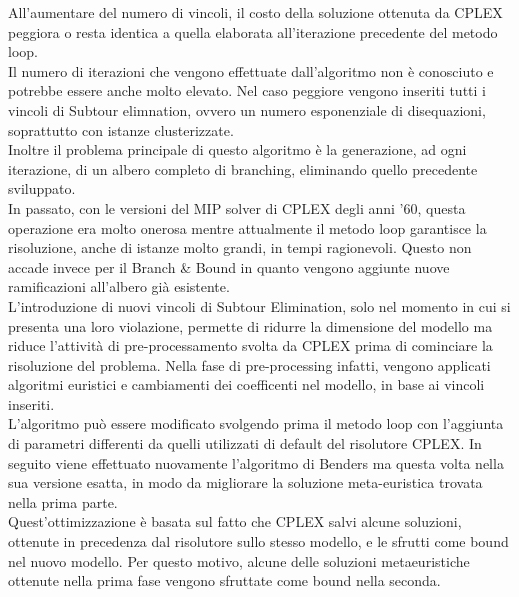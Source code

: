 \vspace{10cm}
All'aumentare del numero di vincoli, il costo della soluzione ottenuta da CPLEX peggiora o resta identica a quella elaborata all'iterazione precedente del metodo loop.\\
Il numero di iterazioni che vengono effettuate dall'algoritmo non è conosciuto e potrebbe essere anche molto elevato. Nel caso peggiore vengono inseriti tutti i vincoli di Subtour elimnation, ovvero un numero esponenziale di disequazioni, soprattutto con istanze clusterizzate.\\
Inoltre il problema principale di questo algoritmo è la generazione, ad ogni iterazione, di un albero completo di branching, eliminando quello precedente sviluppato.\\
In passato, con le versioni del MIP solver di CPLEX degli anni '60, questa operazione era molto onerosa mentre attualmente il metodo loop garantisce la risoluzione, anche di istanze molto grandi, in tempi ragionevoli.
Questo non accade invece per il Branch \& Bound in quanto vengono aggiunte nuove ramificazioni all'albero già esistente.\\
L'introduzione di nuovi vincoli di Subtour Elimination, solo nel momento in cui si presenta una loro violazione, permette di ridurre la dimensione del modello ma riduce l'attività di pre-processamento svolta da CPLEX prima di cominciare la risoluzione del problema. Nella fase di pre-processing infatti, vengono applicati algoritmi euristici e cambiamenti dei coefficenti nel modello, in base ai vincoli inseriti.\\
L'algoritmo può essere modificato svolgendo prima il metodo loop con l'aggiunta di parametri differenti da quelli utilizzati di default del risolutore CPLEX. In seguito viene effettuato nuovamente l'algoritmo di Benders ma questa volta nella sua versione esatta, in modo da migliorare la soluzione meta-euristica trovata nella prima parte. \\
Quest'ottimizzazione è basata sul fatto che CPLEX salvi alcune soluzioni, ottenute in precedenza dal risolutore sullo stesso modello, e le sfrutti come bound nel nuovo modello. Per questo motivo, alcune delle soluzioni metaeuristiche ottenute nella prima fase vengono sfruttate come bound nella seconda.